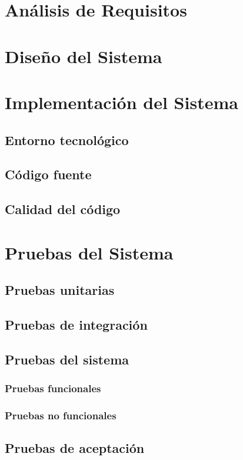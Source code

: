 \section{Análisis de Requisitos}


\section{Diseño del Sistema}	


\section{Implementación del Sistema}
\subsection{Entorno tecnológico}
	
	
\subsection{Código fuente}

\subsection{Calidad del código}

\section{Pruebas del Sistema}

\subsection{Pruebas unitarias}

\subsection{Pruebas de integración}

\subsection{Pruebas del sistema}

\subsubsection{Pruebas funcionales}

\subsubsection{Pruebas no funcionales}

\subsection{Pruebas de aceptación}
